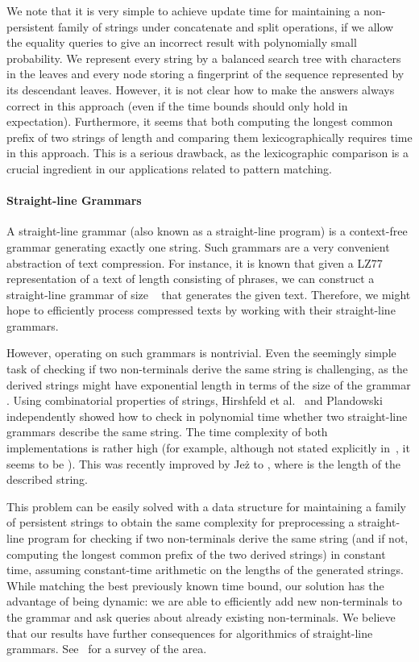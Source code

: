 \documentclass[a4paper]{article}
\theoremstyle{remark}
\begin{document}
We note that it is very simple to achieve  update time for maintaining a non-persistent
family of strings under concatenate and split operations, if we allow the equality queries
to give an incorrect result with polynomially small probability.
We represent every string by a balanced search tree with characters in the leaves and every
node storing a fingerprint of the sequence represented by its descendant leaves. However, it is not clear how to make
the answers always correct in this approach (even if the time bounds should
only hold in expectation). Furthermore, it seems that both computing the longest common
prefix of two strings of length  and comparing them lexicographically requires  time in this approach.
This is a serious drawback, as the lexicographic comparison is a crucial ingredient in our applications related to pattern matching.

\paragraph{Straight-line Grammars}
A straight-line grammar (also known as a straight-line program) is a context-free grammar
generating exactly one string. Such grammars are a very convenient abstraction of text
compression. For instance, it is known that given a LZ77 representation of a text of length 
consisting of  phrases, we can construct a straight-line grammar of size
~\cite{Charikar,Rytter} that generates the given text. Therefore, we might hope to efficiently process
compressed texts by working with their straight-line grammars.

However, operating on such
grammars is nontrivial. Even the seemingly simple task of checking if two non-terminals derive
the same string is challenging, as the derived strings might have exponential
length in terms of the size of the grammar . Using combinatorial properties of strings,
Hirshfeld et al.~\cite{Hirshfeld} and Plandowski~\cite{Plandowski} independently showed
how to check in polynomial time whether two straight-line grammars describe the same string.
The time complexity of both implementations is rather high (for example, although not stated
explicitly in~\cite{Plandowski}, it seems to be ). This was recently improved
by Jeż to , where  is the length of the described string.

This problem can be easily solved with a data structure for maintaining a family of persistent strings
to obtain the same  complexity for 
preprocessing a straight-line program
for checking if two non-terminals derive the same string (and if not, computing the longest common prefix of the two derived strings) in constant time, assuming
constant-time arithmetic on the lengths of the generated strings.
While matching the best previously known time bound, our solution has the advantage of being dynamic:
we are able to efficiently add new non-terminals to the grammar and ask queries about
already existing non-terminals.
We believe that our results have further consequences for algorithmics of straight-line grammars.
See~\cite{LohreySurvey} for a survey of the area.
\end{document}
